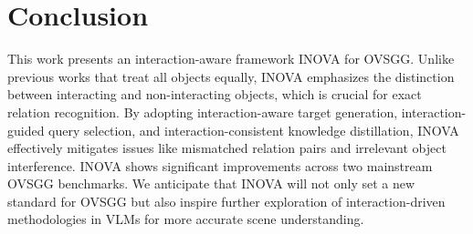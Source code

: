 \section{Conclusion}

This work presents an interaction-aware framework INOVA for OVSGG. Unlike previous works that treat all objects equally, INOVA emphasizes the distinction between interacting and non-interacting objects, which is crucial for exact relation recognition. By adopting interaction-aware target generation, interaction-guided query selection, and interaction-consistent knowledge distillation, INOVA effectively mitigates issues like mismatched relation pairs and irrelevant object interference. INOVA shows significant improvements across two mainstream OVSGG benchmarks. We anticipate that INOVA will not only set a new standard for OVSGG but also inspire further exploration of interaction-driven methodologies in VLMs for more accurate scene understanding.